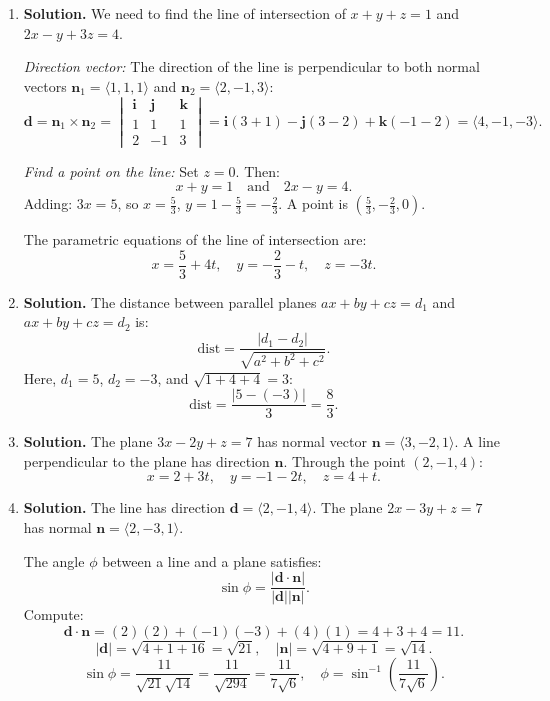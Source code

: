 \begin{enumerate}
\item \textbf{Solution.}
We need to find the line of intersection of \( x + y + z = 1 \) and \( 2x - y + 3z = 4 \).

\textit{Direction vector:} The direction of the line is perpendicular to both normal vectors \( \mathbf{n}_1 = \langle 1, 1, 1 \rangle \) and \( \mathbf{n}_2 = \langle 2, -1, 3 \rangle \):
\[
\mathbf{d} = \mathbf{n}_1 \times \mathbf{n}_2 = \begin{vmatrix} \mathbf{i} & \mathbf{j} & \mathbf{k} \\ 1 & 1 & 1 \\ 2 & -1 & 3 \end{vmatrix} = \mathbf{i}(3 + 1) - \mathbf{j}(3 - 2) + \mathbf{k}(-1 - 2) = \langle 4, -1, -3 \rangle.
\]

\textit{Find a point on the line:} Set \( z = 0 \). Then:
\[
x + y = 1 \quad \text{and} \quad 2x - y = 4.
\]
Adding: \( 3x = 5 \), so \( x = \frac{5}{3} \), \( y = 1 - \frac{5}{3} = -\frac{2}{3} \). A point is \( \left(\frac{5}{3}, -\frac{2}{3}, 0\right) \).

The parametric equations of the line of intersection are:
\[
x = \frac{5}{3} + 4t, \quad y = -\frac{2}{3} - t, \quad z = -3t.
\]

\item \textbf{Solution.}
The distance between parallel planes \( ax + by + cz = d_1 \) and \( ax + by + cz = d_2 \) is:
\[
\text{dist} = \frac{|d_1 - d_2|}{\sqrt{a^2 + b^2 + c^2}}.
\]
Here, \( d_1 = 5 \), \( d_2 = -3 \), and \( \sqrt{1 + 4 + 4} = 3 \):
\[
\text{dist} = \frac{|5 - (-3)|}{3} = \frac{8}{3}.
\]

\item \textbf{Solution.}
The plane \( 3x - 2y + z = 7 \) has normal vector \( \mathbf{n} = \langle 3, -2, 1 \rangle \). A line perpendicular to the plane has direction \( \mathbf{n} \). Through the point \( (2, -1, 4) \):
\[
x = 2 + 3t, \quad y = -1 - 2t, \quad z = 4 + t.
\]

\item \textbf{Solution.}
The line has direction \( \mathbf{d} = \langle 2, -1, 4 \rangle \). The plane \( 2x - 3y + z = 7 \) has normal \( \mathbf{n} = \langle 2, -3, 1 \rangle \).

The angle \( \phi \) between a line and a plane satisfies:
\[
\sin\phi = \frac{|\mathbf{d} \cdot \mathbf{n}|}{|\mathbf{d}||\mathbf{n}|}.
\]
Compute:
\[
\mathbf{d} \cdot \mathbf{n} = (2)(2) + (-1)(-3) + (4)(1) = 4 + 3 + 4 = 11.
\]
\[
|\mathbf{d}| = \sqrt{4 + 1 + 16} = \sqrt{21}, \quad |\mathbf{n}| = \sqrt{4 + 9 + 1} = \sqrt{14}.
\]
\[
\sin\phi = \frac{11}{\sqrt{21}\sqrt{14}} = \frac{11}{\sqrt{294}} = \frac{11}{7\sqrt{6}}, \quad \phi = \sin^{-1}\!\left(\frac{11}{7\sqrt{6}}\right).
\]


\end{enumerate}
